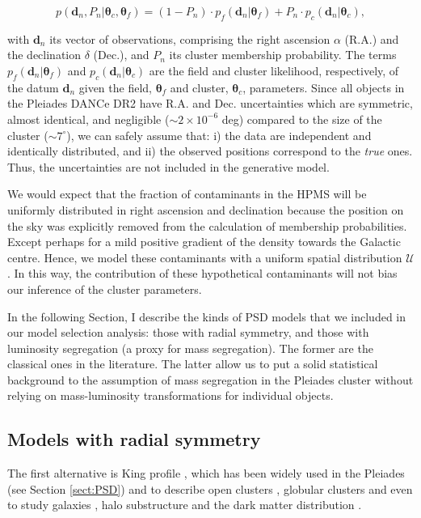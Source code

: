 \begin{equation}
\label{eq:genmodPSD}
p(\mathbf{d}_n, P_n |\boldsymbol{\theta}_c,\boldsymbol{\theta}_f)=(1-P_n) \cdot p_f(\mathbf{d}_n|\boldsymbol{\theta}_f) + P_n\cdot p_c(\mathbf{d}_n| \boldsymbol{\theta}_c),
\end{equation}

with $\mathbf{d}_n$ its vector of observations, comprising the right ascension $\alpha$ (R.A.) and the declination $\delta$ (Dec.), and $P_n$ its cluster membership probability. The terms $p_f(\mathbf{d}_n|\boldsymbol{\theta}_f)$ and $p_c(\mathbf{d}_n|\boldsymbol{\theta}_c)$ are the field and cluster likelihood, respectively, of the datum $\mathbf{d}_n$ given the field, $\boldsymbol{\theta}_f$ and cluster, $\boldsymbol{\theta}_c$, parameters. Since all objects in the Pleiades DANCe DR2 have R.A. and Dec. uncertainties which are symmetric, almost identical, and negligible ($\sim 2\times10^{-6}$ deg) compared to the size of the cluster ($\sim7^{\circ}$), we can safely assume that: i) the data are independent and identically distributed, and ii) the observed positions correspond to the \emph{true} ones. Thus, the uncertainties are not included in the generative model. 

We would expect that the fraction of contaminants in the HPMS will be uniformly distributed in right ascension and declination because the position on the sky was explicitly removed from the calculation of membership probabilities. Except perhaps for a mild positive gradient of the density towards the Galactic centre. Hence, we model these contaminants with a uniform spatial distribution $\mathcal{U}$. In this way, the contribution of these hypothetical contaminants will not bias our inference of the cluster parameters.

In the following Section, I describe the kinds of PSD models that we included in our model selection analysis: those with radial symmetry, and those with luminosity segregation (a proxy for mass segregation). The former are the classical ones in the literature. The latter allow us to put a solid statistical background to the assumption of mass segregation in the Pleiades cluster \cite[see for example][]{2004A&A...426...75M, Converse2010} without relying on mass-luminosity transformations for individual objects. 

\subsection{Models with radial symmetry}
\label{sect:RadialModels}
The first alternative is King profile \citep{King1962}, which has been widely used in the Pleiades (see Section \ref{sect:PSD}) and to describe open clusters
\citep[see][for recent applications]{2017MNRAS.469.1330A,2017MNRAS.468.2684P}, globular clusters \citep{2017ApJ...840L..25M} and even to study
galaxies \citep{2017MNRAS.466.1513R}, halo substructure \citep{2007ApJ...663..960S} and the dark matter distribution \citep{2016MNRAS.458.2848J}. 

